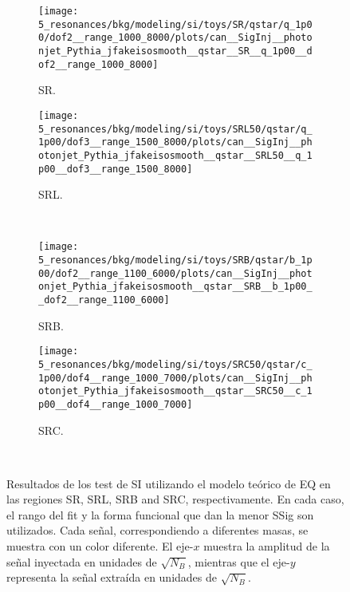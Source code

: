\begin{figure}[ht!]
    \centering
    \begin{subfigure}[h]{0.49\linewidth}
        \centering
        \texttt{[image: 5\_resonances/bkg/modeling/si/toys/SR/qstar/q\_1p00/dof2\_\_range\_1000\_8000/plots/can\_\_SigInj\_\_photonjet\_Pythia\_jfakeisosmooth\_\_qstar\_\_SR\_\_q\_1p00\_\_dof2\_\_range\_1000\_8000]}
        \caption{SR.}
    \end{subfigure}
    \hfill
    \begin{subfigure}[h]{0.49\linewidth}
        \centering
        \texttt{[image: 5\_resonances/bkg/modeling/si/toys/SRL50/qstar/q\_1p00/dof3\_\_range\_1500\_8000/plots/can\_\_SigInj\_\_photonjet\_Pythia\_jfakeisosmooth\_\_qstar\_\_SRL50\_\_q\_1p00\_\_dof3\_\_range\_1500\_8000]}
        \caption{SRL.}
    \end{subfigure}\\
    \begin{subfigure}[h]{0.49\linewidth}
        \centering
        \texttt{[image: 5\_resonances/bkg/modeling/si/toys/SRB/qstar/b\_1p00/dof2\_\_range\_1100\_6000/plots/can\_\_SigInj\_\_photonjet\_Pythia\_jfakeisosmooth\_\_qstar\_\_SRB\_\_b\_1p00\_\_dof2\_\_range\_1100\_6000]}
        \caption{SRB.}
    \end{subfigure}
    \hfill
    \begin{subfigure}[h]{0.49\linewidth}
        \centering
        \texttt{[image: 5\_resonances/bkg/modeling/si/toys/SRC50/qstar/c\_1p00/dof4\_\_range\_1000\_7000/plots/can\_\_SigInj\_\_photonjet\_Pythia\_jfakeisosmooth\_\_qstar\_\_SRC50\_\_c\_1p00\_\_dof4\_\_range\_1000\_7000]}
        \caption{SRC.}
    \end{subfigure}\\
    \caption{Resultados de los test de \ac{SI} utilizando el modelo teórico de \ac{EQ} en las regiones SR, SRL, SRB and SRC, respectivamente. En cada caso, el rango del fit y la forma funcional que dan la menor \ac{SSig} son utilizados. Cada señal, correspondiendo a diferentes masas, se muestra con un color diferente. El eje-\(x\) muestra la amplitud de la señal inyectada en unidades de \(\sqrt{N_B}\), mientras que el eje-\(y\) representa la señal extraída en unidades de \(\sqrt{N_B}\).}
    \label{fig:bkg:modeling:sigbkg:sitest:siginj_qstar}
\end{figure}































